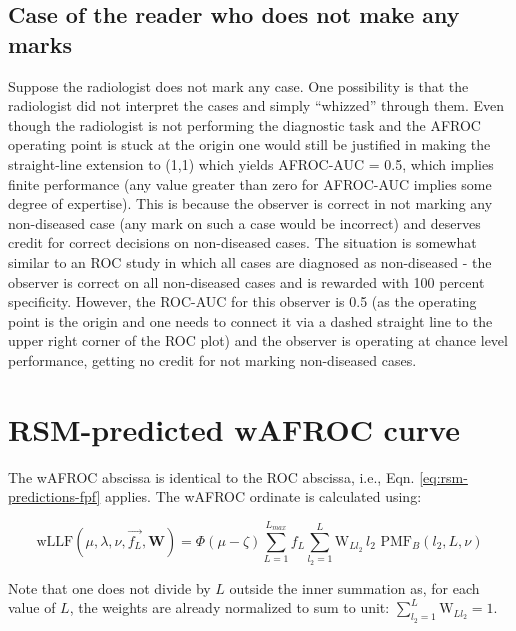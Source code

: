 \documentclass[
]{book}
\begin{document}
\hypertarget{rsm-other-predictions-no-marks}{%
\subsection{Case of the reader who does not make any marks}\label{rsm-other-predictions-no-marks}}

Suppose the radiologist does not mark any case. One possibility is that the radiologist did not interpret the cases and simply ``whizzed'' through them. Even though the radiologist is not performing the diagnostic task and the AFROC operating point is stuck at the origin one would still be justified in making the straight-line extension to (1,1) which yields AFROC-AUC = 0.5, which implies finite performance (any value greater than zero for AFROC-AUC implies some degree of expertise). This is because the observer is correct in not marking any non-diseased case (any mark on such a case would be incorrect) and deserves credit for correct decisions on non-diseased cases. The situation is somewhat similar to an ROC study in which all cases are diagnosed as non-diseased - the observer is correct on all non-diseased cases and is rewarded with 100 percent specificity. However, the ROC-AUC for this observer is 0.5 (as the operating point is the origin and one needs to connect it via a dashed straight line to the upper right corner of the ROC plot) and the observer is operating at chance level performance, getting no credit for not marking non-diseased cases.

\hypertarget{rsm-other-predictions-wafroc-curve}{%
\section{RSM-predicted wAFROC curve}\label{rsm-other-predictions-wafroc-curve}}

The wAFROC abscissa is identical to the ROC abscissa, i.e., Eqn. \eqref{eq:rsm-predictions-fpf} applies. The wAFROC ordinate is calculated using:

\begin{equation} 
\text{wLLF} \left ( \mu, \lambda, \nu, \overrightarrow{f_L}, \mathbf{W} \right ) = \Phi\left ( \mu - \zeta \right )\sum_{L=1}^{L_{max}} f_L \sum_{l_2=1}^{L} \text{W}_{Ll_2} \, l_2 \,\,  \text{PMF}_{B}\left ( l_2, L, \nu \right )
\label{eq:rsm-other-predictions-wllf}
\end{equation}

Note that one does not divide by \(L\) outside the inner summation as, for each value of \(L\), the weights are already normalized to sum to unit: \(\sum_{l_2=1}^{L} \text{W}_{Ll_2}=1\).
\end{document}
